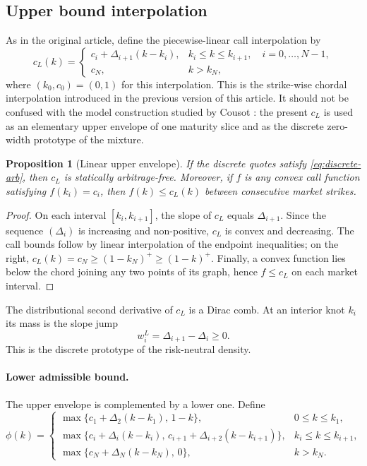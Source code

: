 \documentclass[11pt]{article}
\newtheorem{proposition}[theorem]{Proposition}
\begin{document}
\subsection{Upper bound interpolation}
As in the original article, define the piecewise-linear call interpolation by
\begin{equation}
 c_L(k)=
 \begin{cases}
 c_i+\Delta_{i+1}(k-k_i), & k_i\le k\le k_{i+1},\quad i=0,\ldots,N-1,\\[1mm]
 c_N, & k>k_N,
 \end{cases}
 \label{eq:original-linear-interpolation}
\end{equation}
where $(k_0,c_0)=(0,1)$ for this interpolation. This is the strike-wise chordal interpolation introduced in the previous version of this article. It should not be confused with the model construction studied by Cousot \cite{cousot2007}: the present $c_L$ is used as an elementary upper envelope of one maturity slice and as the discrete zero-width prototype of the mixture.

\begin{proposition}[Linear upper envelope]\label{prop:upper}
If the discrete quotes satisfy \eqref{eq:discrete-arb}, then $c_L$ is statically arbitrage-free. Moreover, if $f$ is any convex call function satisfying $f(k_i)=c_i$, then $f(k)\le c_L(k)$ between consecutive market strikes.
\end{proposition}

\begin{proof}
On each interval $[k_i,k_{i+1}]$, the slope of $c_L$ equals $\Delta_{i+1}$. Since the sequence $(\Delta_i)$ is increasing and non-positive, $c_L$ is convex and decreasing. The call bounds follow by linear interpolation of the endpoint inequalities; on the right, $c_L(k)=c_N\ge(1-k_N)^+\ge(1-k)^+$. Finally, a convex function lies below the chord joining any two points of its graph, hence $f\le c_L$ on each market interval.
\end{proof}

The distributional second derivative of $c_L$ is a Dirac comb. At an interior knot $k_i$ its mass is the slope jump
\begin{equation}
w_i^L=\Delta_{i+1}-\Delta_i\ge0.
\label{eq:dirac-weight}
\end{equation}
This is the discrete prototype of the risk-neutral density.

\paragraph{Lower admissible bound.}
The upper envelope is complemented by a lower one. Define
\begin{equation}
\phi(k)=
\begin{cases}
\max\{c_1+\Delta_2(k-k_1),\,1-k\}, & 0\le k\le k_1,\\[1.5mm]
\max\{c_i+\Delta_i(k-k_i),\,c_{i+1}+\Delta_{i+2}(k-k_{i+1})\},
& k_i\le k\le k_{i+1},\\[1.5mm]
\max\{c_N+\Delta_N(k-k_N),\,0\}, & k>k_N.
\end{cases}
\label{eq:phi}
\end{equation}
\end{document}
